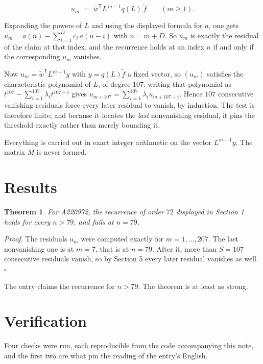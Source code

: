 \documentclass[11pt]{article}
\newtheorem{theorem}{Theorem}
\theoremstyle{definition}
\begin{document}
\[u_m \;=\; \tilde w^{\mathsf T} L^{\,m-1} q(L)\,\tilde f \qquad (m \ge 1).\]

Expanding the powers of $L$ and using the displayed formula for $a$, one gets $u_m = a(n) - \sum_{i=1}^{D} c_i\,a(n-i)$ with $n = m + D$. So $u_m$ is exactly the residual of the claim at that index, and the recurrence holds at an index $n$ if and only if the corresponding $u_m$ vanishes.

Now $u_m = \tilde w^{\mathsf T} L^{m-1} y$ with $y = q(L)\tilde f$ a fixed vector, so $(u_m)$ satisfies the characteristic polynomial of $L$, of degree $107$: writing that polynomial as $t^{107} - \sum_{i=1}^{107} \lambda_i t^{107-i}$ gives $u_{m+107} = \sum_{i=1}^{107} \lambda_i u_{m+107-i}$. Hence $107$ consecutive vanishing residuals force every later residual to vanish, by induction. The test is therefore finite; and because it locates the {\itshape last} nonvanishing residual, it pins the threshold exactly rather than merely bounding it.

Everything is carried out in exact integer arithmetic on the vector $L^{m-1}y$. The matrix $M$ is never formed.

\section{Results}

\begin{theorem} For A220972, the recurrence of order $72$ displayed in Section 1 holds for every $n > 79$, and fails at $n = 79$.\end{theorem}

{\itshape Proof.} The residuals $u_m$ were computed exactly for $m = 1,\dots,207$. The last nonvanishing one is at $m = 7$, that is at $n = 79$. After it, more than $S = 107$ consecutive residuals vanish, so by Section 5 every later residual vanishes as well. $\square$

The entry claims the recurrence for $n > 79$. The theorem is at least as strong.

\section{Verification}

Four checks were run, each reproducible from the code accompanying this note, and the first two are what pin the reading of the entry's English.
\end{document}
